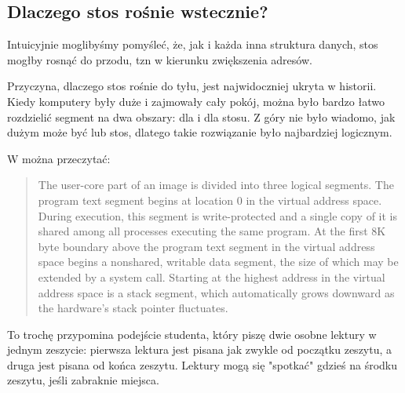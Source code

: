 \subsection{Dlaczego stos rośnie wstecznie?}
\label{stack_grow_backwards}

Intuicyjnie moglibyśmy pomyśleć, że, jak i każda inna struktura danych, stos mogłby rosnąć do przodu, tzn w kierunku zwiększenia adresów.

Przyczyna, dlaczego stos rośnie do tyłu, jest najwidoczniej ukryta w historii.
Kiedy komputery były duże i zajmowały cały pokój, można było bardzo łatwo rozdzielić segment na dwa obszary: dla  i dla stosu.
Z góry nie było wiadomo, jak dużym może być  lub stos, dlatego takie rozwiązanie było najbardziej logicznym.



W \RitchieThompsonUNIX można przeczytać:

\begin{framed}
\begin{quotation}
The user-core part of an image is divided into three logical segments. The program text segment begins at location 0 in the virtual address space. During execution, this segment is write-protected and a single copy of it is shared among all processes executing the same program. At the first 8K byte boundary above the program text segment in the virtual address space begins a nonshared, writable data segment, the size of which may be extended by a system call. Starting at the highest address in the virtual address space is a stack segment, which automatically grows downward as the hardware's stack pointer fluctuates.
\end{quotation}
\end{framed}

To trochę przypomina podejście studenta,
który piszę dwie osobne lektury w jednym zeszycie:
pierwsza lektura jest pisana jak zwykle od początku zeszytu, a druga jest pisana od końca zeszytu.
Lektury mogą się "spotkać" gdzieś na środku zeszytu, jeśli zabraknie miejsca.


